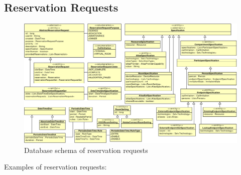 \cleardoublepage
\subsection{Reservation Requests}

\begin{figure}[ht!]
\includegraphics[width=\textwidth]{diagrams/cd_reservation_requests}
\caption{Database schema of reservation requests}
\label{fig:reservation-requests}
\end{figure}

Examples of reservation requests:

